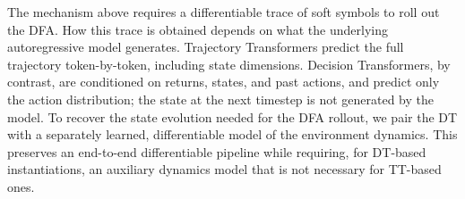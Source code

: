 The mechanism above requires a differentiable trace of soft symbols to roll out the DFA. How this trace is obtained depends on what the underlying autoregressive model generates. Trajectory Transformers predict the full
trajectory token-by-token, including state dimensions.
Decision Transformers, by contrast, are conditioned on returns, states, and past actions, and predict only the
action distribution; the state at the next timestep is not generated by the model. To recover the state evolution needed for the DFA rollout, we pair the DT with a separately learned, differentiable model of the environment dynamics. This preserves an end-to-end differentiable pipeline while requiring, for DT-based instantiations, an auxiliary dynamics model that is not necessary for TT-based ones.
